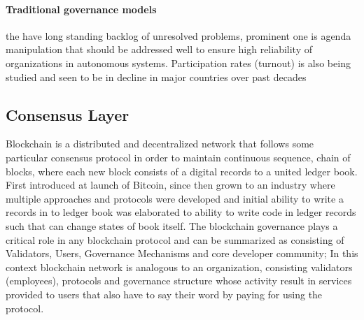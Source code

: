 \documentclass{article}
\begin{document}
\begin{CJK}{UTF8}{gbsn}
\begin{multicols}{2}
        \paragraph{Traditional governance models} the have long standing backlog of unresolved problems, prominent one is agenda manipulation \cite{McKelvey1976} that should be addressed well to ensure high reliability of organizations in autonomous systems. Participation rates (turnout) is also being studied and seen to be in decline in major countries over past decades \cite{Lawrence23}\cite{Filip24}


        \subsection{Consensus Layer}
        Blockchain is a distributed and decentralized network that follows some particular consensus protocol in order to maintain continuous sequence, chain of blocks\cite{Merlinda2019}, where each new block consists of a digital records to a united ledger book. First introduced at launch of Bitcoin\cite{Satoshi}, since then grown to an industry where multiple approaches and protocols were developed and initial ability to write a records in to ledger book was elaborated to ability to write code in ledger records such that can change states of book itself.
        The blockchain governance plays a critical role in any blockchain protocol and can be summarized as consisting of Validators, Users, Governance Mechanisms and core developer community; In this context blockchain network is analogous to an organization, consisting validators (employees), protocols and governance structure whose activity result in services provided to users that also have to say their word by paying for using the protocol.


\end{multicols}
\end{CJK}
\end{document}
